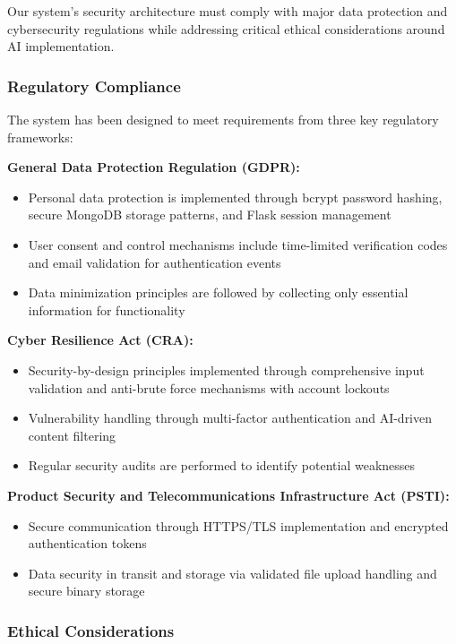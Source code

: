 \documentclass{article}
\begin{document}
Our system's security architecture must comply with major data protection and cybersecurity regulations while addressing critical ethical considerations around AI implementation.

\subsubsection{Regulatory Compliance}

The system has been designed to meet requirements from three key regulatory frameworks:

\textbf{General Data Protection Regulation (GDPR):}

\begin{itemize}
    \item Personal data protection is implemented through bcrypt password hashing, secure MongoDB storage patterns, and Flask session management
    \item User consent and control mechanisms include time-limited verification codes and email validation for authentication events
    \item Data minimization principles are followed by collecting only essential information for functionality
\end{itemize}

\textbf{Cyber Resilience Act (CRA):}

\begin{itemize}
    \item Security-by-design principles implemented through comprehensive input validation and anti-brute force mechanisms with account lockouts
    \item Vulnerability handling through multi-factor authentication and AI-driven content filtering
    \item Regular security audits are performed to identify potential weaknesses
\end{itemize}

\textbf{Product Security and Telecommunications Infrastructure Act (PSTI):}

\begin{itemize}
    \item Secure communication through HTTPS/TLS implementation and encrypted authentication tokens
    \item Data security in transit and storage via validated file upload handling and secure binary storage
\end{itemize}

\subsubsection{Ethical Considerations}
\end{document}
